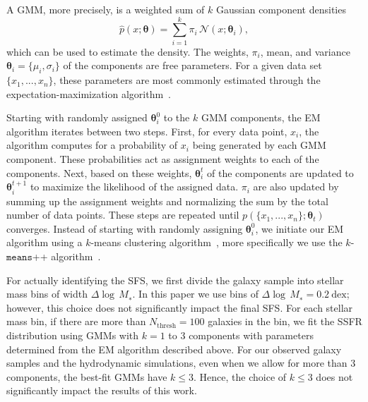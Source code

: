 \documentclass[tighten, preprint]{aastex62}
\begin{document}
A GMM, more precisely, is a weighted sum of $k$ Gaussian component densities 
\begin{equation} \label{eq:gmm}
\hat{p}(x;\bm{\theta}) = \sum\limits_{i=1}^{k} \pi_i \, \mathcal{N}(x; \bm{\theta}_i),
\end{equation}
which can be used to estimate the density. The weights, $\pi_i$, mean, and 
variance $\bm{\theta}_i=\{\mu_i, \sigma_i\}$ of the components are free 
parameters. For a given data set $\{x_1, ..., x_n\}$, these 
parameters are most commonly estimated through the expectation-maximization 
algorithm~\citep[EM;][]{dempster1977,neal1998}. 

Starting with randomly assigned $\bm{\theta}_{i}^0$ to the $k$ GMM components, 
the EM algorithm iterates between two steps. First, for every data point, 
$x_i$, the algorithm computes for a probability of $x_i$ being generated by 
each GMM component. These probabilities act as assignment weights to each of
the components. Next, based on these weights, $\bm{\theta}_i^t$ of the components 
are updated to $\bm{\theta}_i^{t+1}$ to maximize the likelihood of the assigned 
data. $\pi_i$ are also updated by summing up the assignment weights and 
normalizing the sum by the total number of data points. These steps are 
repeated until $p(\{x_1, ..., x_n\} ; \bm{\theta}_t)$ converges. Instead of 
starting with randomly assigning $\bm{\theta}_{i}^0$, we initiate our EM algorithm 
using a $k$-means clustering algorithm~\citep{lloyd1982}, more specifically 
we use the $k$-$\mathtt{means}$++ algorithm~\citep{arthur2007}. 

For actually identifying the SFS, we first divide the galaxy 
sample into stellar mass bins of width $\Delta \log\,M_∗$. In this paper 
we use bins of $\Delta \log\,M_∗ = 0.2\ \mathrm{dex}$; however, this 
choice does not significantly impact the final SFS. For each stellar 
mass bin, if there are more than $N_\mathrm{thresh}{=}100$ galaxies in the bin, 
we fit the SSFR distribution using GMMs with $k{=}1$ to 3 components with 
parameters determined from the EM algorithm described above. 
For our observed galaxy samples and the hydrodynamic simulations, even when we 
allow for more than 3 components, the best-fit GMMs have $k\leq3$. Hence, the 
choice of $k\leq3$ does not significantly impact the results of this work.
\end{document}
